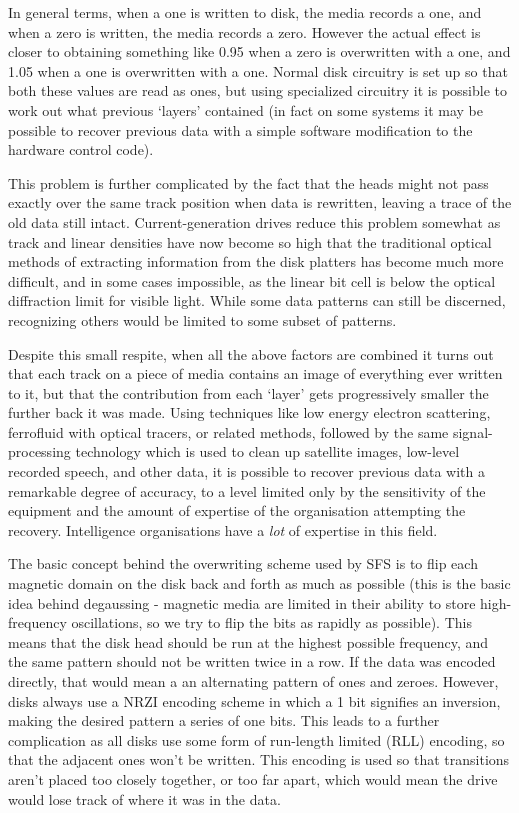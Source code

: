 In general terms, when a one is written to disk, the media records a one, and
when a zero is written, the media records a zero.  However the actual effect is
closer to obtaining something like 0.95 when a zero is overwritten with a one,
and 1.05 when a one is overwritten with a one.  Normal disk circuitry is set up
so that both these values are read as ones, but using specialized circuitry it
is possible to work out what previous `layers' contained (in fact on some
systems it may be possible to recover previous data with a simple software
modification to the hardware control code).

This problem is further complicated by the fact that the heads might not pass
exactly over the same track position when data is rewritten, leaving a trace of
the old data still intact.  Current-generation drives reduce this problem
somewhat as track and linear densities have now become so high that the
traditional optical methods of extracting information from the disk platters
has become much more difficult, and in some cases impossible, as the linear bit
cell is below the optical diffraction limit for visible light.  While some data
patterns can still be discerned, recognizing others would be limited to some
subset of patterns.

Despite this small respite, when all the above factors are combined it turns
out that each track on a piece of media contains an image of everything ever
written to it, but that the contribution from each `layer' gets progressively
smaller the further back it was made.  Using techniques like low energy
electron scattering, ferrofluid with optical tracers, or related methods,
followed by the same signal-processing technology which is used to clean up 
satellite images, low-level recorded speech, and other data, it is possible to 
recover previous data with a remarkable degree of accuracy, to a level limited 
only by the sensitivity of the equipment and the amount of expertise of the 
organisation attempting the recovery.  Intelligence organisations have a {\em lot} 
of expertise in this field.

The basic concept behind the overwriting scheme used by SFS is to flip each
magnetic domain on the disk back and forth as much as possible (this is the
basic idea behind degaussing - magnetic media are limited in their ability to
store high-frequency oscillations, so we try to flip the bits as rapidly as
possible).  This means that the disk head should be run at the highest possible
frequency, and the same pattern should not be written twice in a row.  If the
data was encoded directly, that would mean a an alternating pattern of ones and
zeroes.  However, disks always use a NRZI encoding scheme in which a 1 bit
signifies an inversion, making the desired pattern a series of one bits.  This
leads to a further complication as all disks use some form of run-length
limited (RLL) encoding, so that the adjacent ones won't be written.  This
encoding is used so that transitions aren't placed too closely together, or too
far apart, which would mean the drive would lose track of where it was in the
data.

